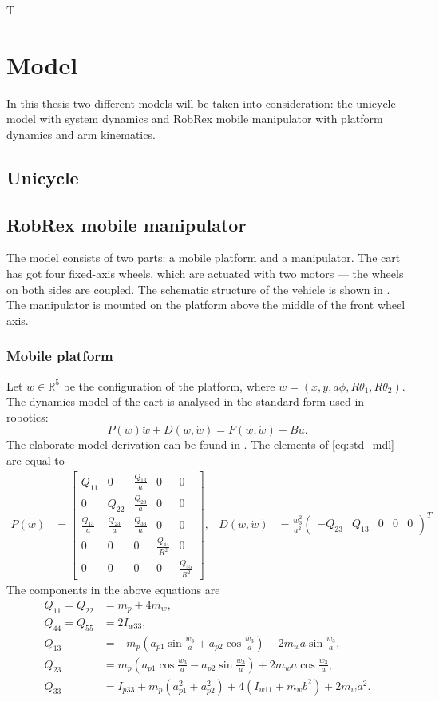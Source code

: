 T\chapter{Model}
In this thesis two different models will be taken into consideration: the unicycle model with system dynamics and RobRex mobile manipulator with platform dynamics and arm kinematics.
\section{Unicycle}


\section{RobRex mobile manipulator}
The model consists of two parts: a mobile platform and a manipulator. The cart has got four fixed-axis wheels, which are actuated with two motors --- the wheels on both sides are coupled. The schematic structure of the vehicle is shown in . %
The manipulator is mounted on the platform above the middle of the front wheel axis.
\subsection{Mobile platform}
Let $w\in \mathbb{R}^5$ be the configuration of the platform, where
$w=(x, y, a\phi, R\theta_1, R\theta_2)$.  
The dynamics model of the cart is analysed in the standard form used in robotics:
\begin{equation}
\label{eq:std_mdl}
P(w)\ddot w + D(w, \dot w) = F(w, \dot w) + Bu.
\end{equation}
The elaborate model derivation can be found in \cite{coupled}. 
The elements of \eqref{eq:std_mdl} are equal to
\begin{align*}
P(w) &= \begin{bmatrix}
Q_{11} & 0 & \frac{Q_{13}}{a} & 0 & 0\\
0 & Q_{22} & \frac{Q_{23}}{a} & 0 & 0\\
\frac{Q_{13}}{a} & \frac{Q_{23}}{a} & \frac{Q_{33}}{a} & 0 & 0\\
0 & 0 & 0 & \frac{Q_{44}}{R^2} & 0 \\
0 & 0 & 0 & 0 & \frac{Q_{55}}{R^2}
\end{bmatrix}, & 
D(w, \dot w) &= \frac{\dot w_3^2}{a^2}\begin{pmatrix}
-Q_{23} & Q_{13} & 0 & 0 & 0
\end{pmatrix}^T
\end{align*}
The components in the above equations are
\begin{align*}
Q_{11} = Q_{22} &= m_p+4m_w,\\
Q_{44} = Q_{55} &= 2I_{w33},\\
Q_{13} &= -m_p(a_{p1}\sin\frac{w_3}{a}+a_{p2}\cos\frac{w_3}{a})- 2m_wa\sin\frac{w_3}{a},\\
Q_{23} &=  m_p(a_{p1}\cos\frac{w_3}{a}-a_{p2}\sin\frac{w_3}{a})+ 2m_wa\cos\frac{w_3}{a},\\
Q_{33} &= I_{p33}+m_p(a_{p1}^2+a_{p2}^2)+4(I_{w11}+m_wb^2)+2m_wa^2.
\end{align*}


